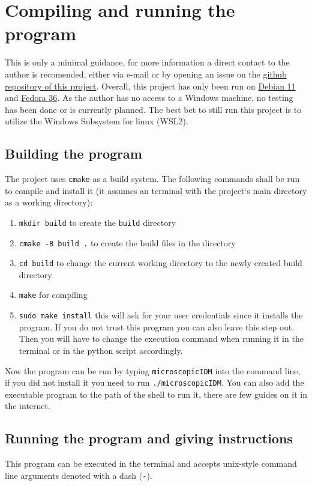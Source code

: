 \section{Compiling and running the program}
\label{sec:manual_execution}
This is only a minimal guidance, for more information a direct contact to the author is recomended,
either via e-mail or by opening an issue on the
\href{https://github.com/dormail/IntelligentDriver}{github repository of this project}. Overall,
this project has only been run on 
\href{https://www.debian.org/}{Debian 11} and \href{https://getfedora.org/}{Fedora 36}. As the
author has no access to a Windows machine, no testing has been done or is currently planned. The best bet to
still run this project is to utilize the Windows Subsystem for linux (WSL2).

\subsection{Building the program}
The project uses \texttt{cmake} as a build system. The following commands shall be run to compile
and install it (it assumes an terminal with the project`s main directory as a working directory):
\begin{enumerate}
  \item \texttt{mkdir build} to create the \texttt{build} directory
  \item \texttt{cmake -B build .} to create the build files in the directory
  \item \texttt{cd build} to change the current working directory to the newly created build
    directory
  \item \texttt{make} for compiling
  \item \texttt{sudo make install} this will ask for your user credentials since it installs the
    program. If you do not trust this program you can also leave this step out. Then you will have
    to change the execution command when running it in the terminal or in the python script
    accordingly. 
\end{enumerate}
Now the program can be run by typing \texttt{microscopicIDM} into the command line, if you did not
install it you need to run \texttt{./microscopicIDM}. You can also add the executable program to the
path of the shell to run it, there are few guides on it in the internet.

\subsection{Running the program and giving instructions}
This program can be executed in the terminal and accepts unix-style command line arguments denoted
with a dash (\texttt{-}).

